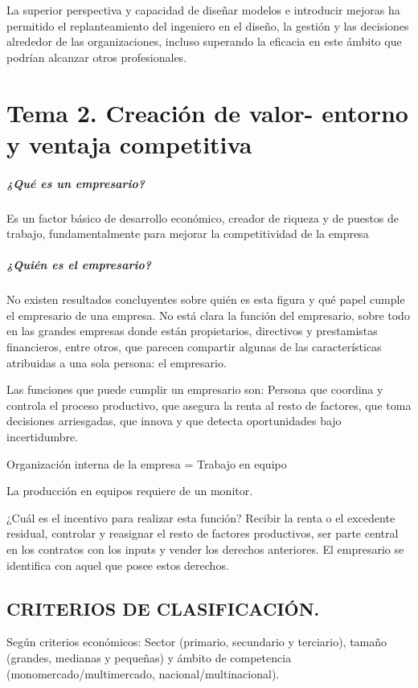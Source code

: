 \documentclass[12pt, twoside, openright]{report} %
\begin{document}
La superior perspectiva y capacidad de diseñar modelos e introducir mejoras ha permitido el replanteamiento
del ingeniero en el diseño, la gestión y las decisiones alrededor de las organizaciones, incluso superando la
eficacia en este ámbito que podrían alcanzar otros profesionales.



\chapter{Tema 2. Creación de valor- entorno y ventaja competitiva}
\paragraph{¿Qué es un empresario?} Es un factor básico de desarrollo económico, creador de riqueza y de puestos de
trabajo, fundamentalmente para mejorar la competitividad de la empresa

\paragraph{¿Quién es el empresario?} No existen resultados concluyentes sobre quién es esta figura y qué papel cumple
el empresario de una empresa. No está clara la función del empresario, sobre todo en las grandes empresas
donde están propietarios, directivos y prestamistas financieros, entre otros, que parecen compartir algunas
de las características atribuidas a una sola persona: el empresario.

Las funciones que puede cumplir un empresario son: Persona que coordina y controla el proceso productivo,
que asegura la renta al resto de factores, que toma decisiones arriesgadas, que innova y que detecta
oportunidades bajo incertidumbre.

Organización interna de la empresa = Trabajo en equipo

La producción en equipos requiere de un monitor.

¿Cuál es el incentivo para realizar esta función? Recibir la renta o el excedente residual, controlar y reasignar
el resto de factores productivos, ser parte central en los contratos con los inputs y vender los derechos
anteriores. El empresario se identifica con aquel que posee estos derechos.

\section{CRITERIOS DE CLASIFICACIÓN.}
Según criterios económicos: Sector (primario, secundario y terciario), tamaño (grandes, medianas y
pequeñas) y ámbito de competencia (monomercado/multimercado, nacional/multinacional).
\end{document}
